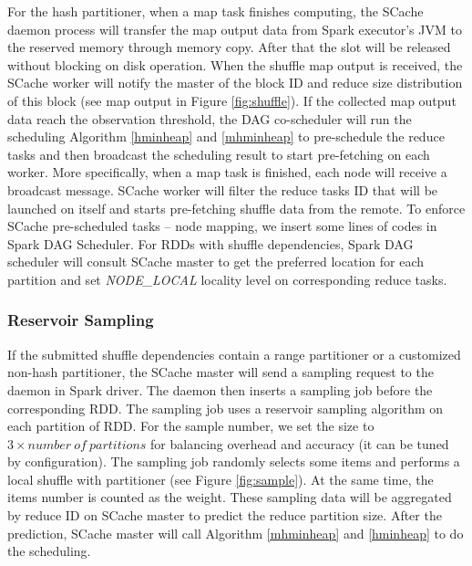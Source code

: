 For the hash partitioner, when a map task finishes computing, the SCache daemon process will transfer the map output data from Spark executor's JVM to the reserved memory through memory copy.
After that the slot will be released without blocking on disk operation.
When the shuffle map output is received, the SCache worker will notify the master of the block ID and reduce size distribution of this block (see map output in Figure \ref{fig:shuffle}).
If the collected map output data reach the observation threshold, the DAG co-scheduler will run the scheduling Algorithm \ref{hminheap} and \ref{mhminheap} to pre-schedule the reduce tasks and then broadcast the scheduling result to start pre-fetching on each worker.
More specifically, when a map task is finished, each node will receive a broadcast message. SCache worker will filter the reduce tasks ID that will be launched on itself and starts pre-fetching shuffle data from the remote. 
To enforce SCache pre-scheduled tasks -- node mapping, we insert some lines of codes in Spark DAG Scheduler.
For RDDs with shuffle dependencies, Spark DAG scheduler will consult SCache master to get the preferred location for each partition and set \textit{NODE\_LOCAL} locality level on corresponding reduce tasks.

\subsubsection{Reservoir Sampling}\label{sampling}
If the submitted shuffle dependencies contain a range partitioner or a customized non-hash partitioner, the SCache master will send a sampling request to the daemon in Spark driver. The daemon then inserts a sampling job before the corresponding RDD. The sampling job uses a reservoir sampling algorithm \cite{reservoir} on each partition of RDD. For the sample number, we set the size to $3 \times number\ of\ partitions$ for balancing overhead and accuracy (it can be tuned by configuration). The sampling job randomly selects some items and performs a local shuffle with partitioner (see Figure \ref{fig:sample}). At the same time, the items number is counted as the weight. These sampling data will be aggregated by reduce ID on SCache master to predict the reduce partition size. After the prediction, SCache master will call Algorithm \ref{mhminheap} and \ref{hminheap} to do the scheduling.

